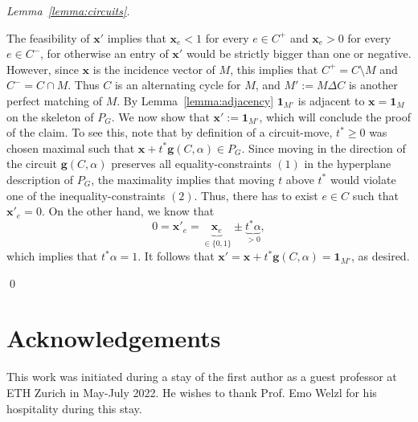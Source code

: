 \documentclass[runningheads]{llncs}
\begin{document}
\begin{proof}[Lemma~\ref{lemma:circuits}]
\begin{enumerate}
    The feasibility of $\mathbf{x}'$ implies that $\mathbf{x}_e<1$ for every $e \in C^+$ and $\mathbf{x}_e>0$ for every $e \in C^-$, for otherwise an entry of $\mathbf{x}'$ would be strictly bigger than one or negative. However, since $\mathbf{x}$ is the incidence vector of $M$, this implies that $C^+=C \setminus M$ and $C^-=C\cap M$. Thus $C$ is an alternating cycle for $M$, and $M':=M \Delta C$ is another perfect matching of $M$. By Lemma~\ref{lemma:adjacency} $\mathbf{1}_{M'}$ is adjacent to $\mathbf{x}=\mathbf{1}_M$ on the skeleton of $P_G$. We now show that $\mathbf{x}':=\mathbf{1}_{M'}$, which will conclude the proof of the claim. To see this, note that by definition of a circuit-move, $t^\ast \ge 0$ was chosen maximal such that $\mathbf{x}+t^\ast\mathbf{g}(C,\alpha) \in P_G$. Since moving in the direction of the circuit $\mathbf{g}(C,\alpha)$ preserves all equality-constraints $(1)$ in the hyperplane description of $P_G$, the maximality implies that moving $t$ above $t^\ast$ would violate one of the inequality-constraints $(2)$. Thus, there has to exist $e \in C$ such that $\mathbf{x}'_e =0$. On the other hand, we know that $$0=\mathbf{x}'_e=\underbrace{\mathbf{x}_e}_{\in \{0,1\}}\pm \underbrace{t^\ast\alpha}_{>0},$$ which implies that $t^\ast\alpha=1$. It follows that  $\mathbf{x}'=\mathbf{x}+t^\ast\mathbf{g}(C,\alpha)=\mathbf{1}_{M'}$, as desired. 
\end{enumerate}
\qed\end{proof}

\section*{Acknowledgements}

This work was initiated during a stay of the first author as a guest professor at ETH Zurich in May-July 2022. He wishes to thank Prof. Emo Welzl for his hospitality during this stay.



\end{document}
